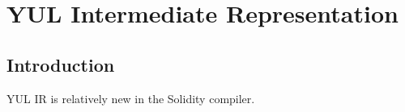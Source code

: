 \chapter*{YUL Intermediate Representation} 


\section*{Introduction}
YUL IR is relatively new in the Solidity compiler.





















